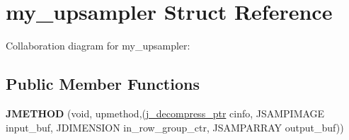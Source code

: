 \hypertarget{structmy__upsampler}{\section{my\+\_\+upsampler Struct Reference}
\label{structmy__upsampler}
}


Collaboration diagram for my\+\_\+upsampler\+:
\subsection*{Public Member Functions}
\begin{DoxyCompactItemize}
\item 
\hypertarget{structmy__upsampler_a6d4b85127ea561ce45e42fbff490d5d1}{{\bfseries J\+M\+E\+T\+H\+O\+D} (void, upmethod,(\hyperlink{structjpeg__decompress__struct}{j\+\_\+decompress\+\_\+ptr} cinfo, J\+S\+A\+M\+P\+I\+M\+A\+G\+E input\+\_\+buf, J\+D\+I\+M\+E\+N\+S\+I\+O\+N in\+\_\+row\+\_\+group\+\_\+ctr, J\+S\+A\+M\+P\+A\+R\+R\+A\+Y output\+\_\+buf))}\label{structmy__upsampler_a6d4b85127ea561ce45e42fbff490d5d1}

\end{DoxyCompactItemize}
